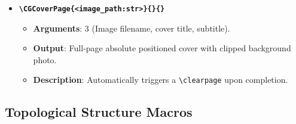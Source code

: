 \begin{itemize}
    \item \textbf{\texttt{\textbackslash CGCoverPage\{<image\_path:str>\}\{<title:tl>\}\{<subtitle:tl>\}}}
    \begin{itemize}
        \item \textbf{Arguments}: 3 (Image filename, cover title, subtitle).
        \item \textbf{Output}: Full-page absolute positioned cover with clipped background photo.
        \item \textbf{Description}: Automatically triggers a \texttt{\textbackslash clearpage} upon completion.
    \end{itemize}
\end{itemize}

\subsection{Topological Structure Macros}

